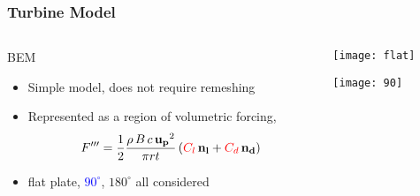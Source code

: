 \documentclass[mathserif]{beamer}
\begin{document}
%
%
%
\begin{frame}
  \frametitle{Turbine Model}
  
  \begin{columns}[]
    \begin{column}{0.6\linewidth}
      
      \begin{block}{BEM}
        \begin{itemize}
	\item Simple model, does not require remeshing
        \item Represented as a region of volumetric forcing,
          \begin{equation}
            F''' = \frac{1}{2}\frac{\rho\, B\, c\,
              {\bf u_p}^2}{\pi r t}\left(\textcolor{red}{C_l} \, {\bf
				    n_l} + \textcolor{red}{C_d}
				    \, {\bf n_d} \right)
          \end{equation}
	 \item flat plate, \textcolor{blue}{$90^{\circ}$}, $180^{\circ}$
	       all considered
        \end{itemize}
      \end{block}
      
    \end{column}
    \begin{column}{0.4\linewidth}
      
      \begin{center}
        \texttt{[image: flat]}
      \end{center}

      \begin{center}
        \texttt{[image: 90]}
      \end{center}

      
    \end{column}
  \end{columns}
  
\end{frame}
\end{document}
